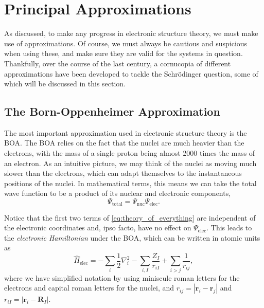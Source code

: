 \section{Principal Approximations}

As discussed, to make any progress in electronic structure theory, we must make use of approximations. Of course, we must always be cautious and suspicious when using these, and make sure they are valid for the systems in question. Thankfully, over the course of the last century, a cornucopia of different approximations have been developed to tackle the Schr\"odinger question, some of which will be discussed in this section.

\subsection{The Born-Oppenheimer Approximation}

The most important approximation used in electronic structure theory is the \gls{BOA}.\cite{bornZur1927} The \gls{BOA} relies on the fact that the nuclei are much heavier than the electrons, with the mass of a single proton being almost 2000 times the mass of an electron. As an intuitive picture, we may think of the nuclei as moving much slower than the electrons, which can adapt themselves to the instantaneous positions of the nuclei. In mathematical terms, this means we can take the total wave function to be a product of its nuclear and electronic components,
\begin{equation}
    \Psi_\mathrm{total} = \Psi_\mathrm{nuc} \Psi_\mathrm{elec}.
\end{equation}

Notice that the first two terms of \eqref{eq:theory_of_everything} are independent of the electronic coordinates and, ipso facto, have no effect on $\Psi_\mathrm{elec}$. This leads to the \emph{electronic Hamiltonian} under the \gls{BOA}, which can be written in atomic units as
\begin{equation}
\label{eq:elec_hamiltonian}
\hat H_\mathrm{elec} = -\sum_{i} \frac{1}{2} \nabla_i^2 - \sum_{i,I} \frac{Z_I}{r_{iI}} + \sum_{i\gt j} \frac{1}{r_{ij}},
\end{equation}
where we have simplified notation by using miniscule roman letters for the electrons and capital roman letters for the nuclei, and $r_{ij}=|\mathbf{r}_i-\mathbf{r}_j|$ and $r_{iI}=|\mathbf{r}_i-\mathbf{R}_I|$.

